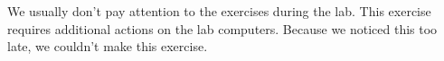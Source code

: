 We usually don't pay attention to the exercises during the lab.
This exercise requires additional actions on the lab computers. Because we noticed this too late, we couldn't make this exercise.